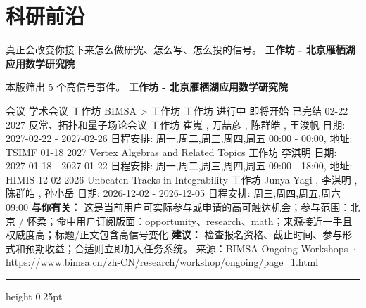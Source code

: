 \documentclass[10.5pt]{ctexart}
\begin{document}
\section*{科研前沿}
{\color{ormuted} 真正会改变你接下来怎么做研究、怎么写、怎么投的信号。}
\vspace{2mm}
{\LARGE\bfseries 工作坊 - 北京雁栖湖应用数学研究院}\par
\vspace{1mm}
{\color{ormuted} 本版筛出 5 个高信号事件。}
\vspace{3mm}
{\Large\bfseries 工作坊 - 北京雁栖湖应用数学研究院}\par
会议 学术会议 工作坊 BIMSA > 工作坊 工作坊 进行中 即将开始 已完结 02-22 2027 反常、拓扑和量子场论会议 工作坊 崔嵬 , 万喆彦 , 陈群皓 , 王浚帆 日期: 2027-02-22 - 2027-02-26 日程安排: 周一,周二,周三,周四,周五 00:00 - 00:00, 地址: TSIMF 01-18 2027 Vertex Algebras and Related Topics 工作坊 李淇明 日期: 2027-01-18 - 2027-01-22 日程安排: 周一,周二,周三,周四,周五 09:00 - 18:00, 地址: HIMIS 12-02 2026 Unbeaten Tracks in Integrability 工作坊 Junya Yagi , 李淇明 , 陈群皓 , 孙小岳 日期: 2026-12-02 - 2026-12-05 日程安排: 周三,周四,周五,周六 09:00
\textbf{与你有关：} 这是当前用户可实际参与或申请的高可触达机会；参与范围：北京 / 怀柔；命中用户订阅版面：opportunity、research、math；来源接近一手且权威度高；标题/正文包含高信号变化
\textbf{建议：} 检查报名资格、截止时间、参与形式和预期收益；合适则立即加入任务系统。
{\footnotesize\color{ormuted} 来源：BIMSA Ongoing Workshops · \url{https://www.bimsa.cn/zh-CN/research/workshop/ongoing/page_1.html}}
\vspace{4mm}
\hrule height 0.25pt
\vspace{3mm}
\end{document}
